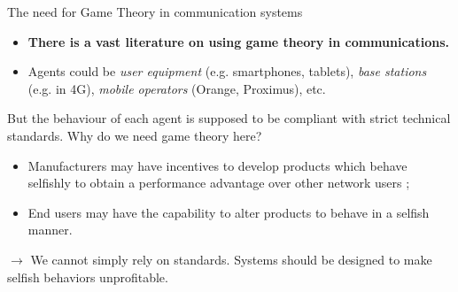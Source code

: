\usetikzlibrary{calc}
\usetikzlibrary{decorations.pathreplacing,decorations.markings,shapes.geometric}

\newcommand{\BS}[1]{%
	\begin{tikzpicture}
		\node[station] (base) {#1};
		\draw[line join=bevel] (base.100) -- (base.80) -- (base.110) -- (base.70) -- (base.north west)
        -- (base.north east);
		\draw[line join=bevel] (base.100) -- (base.70) (base.110) -- (base.north east);
		\draw[line cap=rect] ([yshift=0pt]base.north) [antenna=1];
	\end{tikzpicture}
}

\newcommand{\UE}[1]{%
	\begin{tikzpicture}
        \node (ue) {$\underset{#1}{\smartphone}$};
	\end{tikzpicture}
}

\begin{frame}{The need for Game Theory in communication systems}
    \begin{itemize}
        \item \textbf{There is a vast literature on using game theory in communications.}
        \item Agents could be \textit{user equipment} (e.g. smartphones, tablets),
        \textit{base stations} (e.g. in 4G), \textit{mobile operators} (Orange, Proximus), etc.
    \end{itemize}

    \pause
    \begin{alertblock}{But the behaviour of each agent is supposed to be compliant with strict
    technical standards. Why do we need game theory here?}
        \begin{itemize}
            \pause
            \item Manufacturers may have incentives to develop products which behave selfishly
            to obtain a performance advantage over other network users ;
            \pause
            \item End users may have the capability to alter products to behave in a selfish
            manner.
        \end{itemize}
    \end{alertblock}

    \pause
    $\to$ We cannot simply rely on standards. {\color{green}Systems should be designed to
    make selfish behaviors unprofitable.}
\end{frame}

